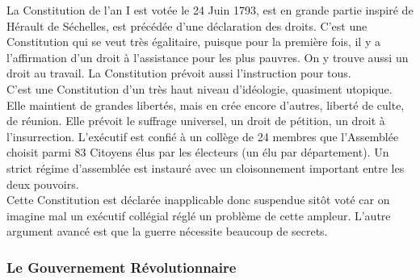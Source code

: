 \documentclass[10pt, a4paper, openany]{book}
\begin{document}
La Constitution de l'an I est votée le 24 Juin 1793, est en grande partie inspiré de Hérault de Séchelles, est précédée d'une déclaration des droits. C'est une Constitution qui se veut très égalitaire, puisque pour la première fois, il y a l'affirmation d'un droit à l'assistance pour les plus pauvres. On y trouve aussi un droit au travail. La Constitution prévoit aussi l'instruction pour tous. \\
C'est une Constitution d'un très haut niveau d'idéologie, quasiment utopique. Elle maintient de grandes libertés, mais en crée encore d'autres, liberté de culte, de réunion. Elle prévoit le suffrage universel, un droit de pétition, un droit à l'insurrection. L'exécutif est confié à un collège de 24 membres que l'Assemblée choisit parmi 83 Citoyens élus par les électeurs (un élu par département). Un strict régime d'assemblée est instauré avec un cloisonnement important entre les deux pouvoirs. \\
Cette Constitution est déclarée inapplicable donc suspendue sitôt voté car on imagine mal un exécutif collégial réglé un problème de cette ampleur. L'autre argument avancé est que la guerre nécessite beaucoup de secrets. 

\subsubsection{Le Gouvernement Révolutionnaire}
\end{document}
